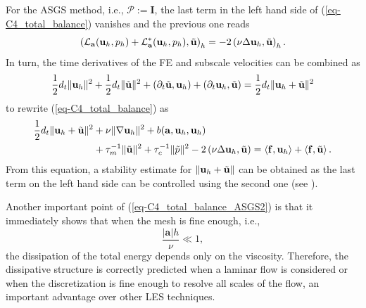 For the ASGS method, i.e., $\mathcal{P}:=\mathbf{I}$, the last term in the left hand side of (\ref{eq-C4_total_balance}) vanishes and the previous one reads
\begin{equation}
\left(\mathcal{L}_{{\bf a}}({\bf u}_h,p_h)+\mathcal{L}^*_{{\bf a}}({\bf u}_h,p_h),\tilde{{\bf u}}\right)_h=
-2 \left(\nu\Delta{\bf u}_h,\tilde{{\bf u}}\right)_h.
\end{equation}
In turn, the time derivatives of the FE and subscale velocities can be combined as
\begin{align}
\label{eq-C4_time_deriv_ASGS}
\frac{1}{2}d_t\|{\bf u}_h\|^2+\frac{1}{2}d_t\|\tilde{{\bf u}}\|^2+(\partial_t\tilde{{\bf u}},{\bf u}_h)+\left(\partial_t{\bf u}_h,\tilde{{\bf u}}\right)=\frac{1}{2}d_t\|{\bf u}_h+\tilde{{\bf u}}\|^2
\end{align}
to rewrite (\ref{eq-C4_total_balance}) as
\begin{align}
\label{eq-C4_total_balance_ASGS2}
\frac{1}{2}d_t\|{\bf u}_h+\tilde{{\bf u}}\|^2
&+\nu\|\nabla{\bf u}_h\|^2+b({\bf a},{\bf u}_h,{\bf u}_h) \\ \nonumber
&+\tau_m^{-1}\|\tilde{{\bf u}}\|^2+\tau_c^{-1}\|\tilde{p}\|^2-2 \left(\nu\Delta{\bf u}_h,\tilde{{\bf u}}\right)=\left<\mathbf{f},\mathbf{u}_h\right>+\left<\mathbf{f},\tilde{{\bf u}}\right>.
\end{align}
From this equation, a stability estimate for $\|{\bf u}_h+\tilde{{\bf u}}\|$ can be obtained as the last term on the left hand side can be controlled using the second one (see \cite[Remark 4.7]{Badia2009a}).%

Another important point of (\ref{eq-C4_total_balance_ASGS2}) is that it immediately shows that when the mesh is fine enough, i.e., 
\begin{equation*}
\frac{\left| \mathbf{a}\right| h}{\nu }\ll 1,
\end{equation*}
the dissipation of the total energy depends only on the viscosity. Therefore, the dissipative structure is correctly predicted when a laminar flow is considered or when the discretization is fine enough to resolve all scales of the flow, an important advantage over other LES techniques.

